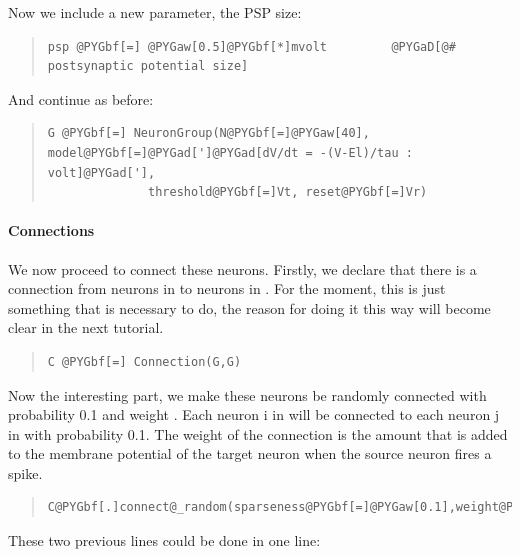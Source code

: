 \documentclass[letterpaper,10pt,english]{manual}
\begin{document}
Now we include a new parameter, the PSP size:
\begin{quote}

\begin{Verbatim}[commandchars=@\[\]]
psp @PYGbf[=] @PYGaw[0.5]@PYGbf[*]mvolt         @PYGaD[@# postsynaptic potential size]
\end{Verbatim}
\end{quote}

And continue as before:
\begin{quote}

\begin{Verbatim}[commandchars=@\[\]]
G @PYGbf[=] NeuronGroup(N@PYGbf[=]@PYGaw[40], model@PYGbf[=]@PYGad[']@PYGad[dV/dt = -(V-El)/tau : volt]@PYGad['],
              threshold@PYGbf[=]Vt, reset@PYGbf[=]Vr)
\end{Verbatim}
\end{quote}


\paragraph{Connections}

We now proceed to connect these neurons. Firstly, we declare
that there is a connection from neurons in  to neurons in .
For the moment, this is just something that is necessary to
do, the reason for doing it this way will become clear in the
next tutorial.
\begin{quote}

\begin{Verbatim}[commandchars=@\[\]]
C @PYGbf[=] Connection(G,G)
\end{Verbatim}
\end{quote}

Now the interesting part, we make these neurons be randomly
connected with probability 0.1 and weight . Each neuron
i in  will be connected to each neuron j in 
with probability 0.1. The weight of the connection is the
amount that is added to the membrane potential of the target
neuron when the source neuron fires a spike.
\begin{quote}

\begin{Verbatim}[commandchars=@\[\]]
C@PYGbf[.]connect@_random(sparseness@PYGbf[=]@PYGaw[0.1],weight@PYGbf[=]psp)
\end{Verbatim}
\end{quote}

These two previous lines could be done in one line:
\end{document}
